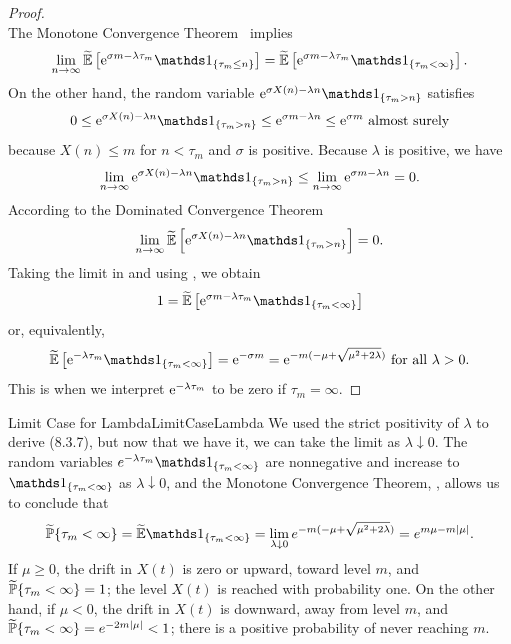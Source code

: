 \begin{proof}
\[	\]
	The Monotone Convergence Theorem~ implies
	\begin{equation} \label{eq:MonotoneConvergenceLimit}
		\lim_{n \to \infty} \widetilde{\E}\left[\e^{\sigma m - \lambda \tau_m}\I_{\{\tau_m \le n\}}\right] = \widetilde{\E}\left[\e^{\sigma m - \lambda \tau_m}\I_{\{\tau_m < \infty\}}\right].
	\end{equation}
	On the other hand, the random variable \(\e^{\sigma X(n) - \lambda n}\I_{\{\tau_m > n\}}\) satisfies
	\[
		0 \le \e^{\sigma X(n) - \lambda n}\I_{\{\tau_m > n\}} \le \e^{\sigma m - \lambda n} \le \e^{\sigma m} \text{ almost surely}
	\]
	because \(X(n) \le m\) for \(n < \tau_m\) and \(\sigma\) is positive. Because \(\lambda\) is positive, we have
	\[
		\lim_{n \to \infty} \e^{\sigma X(n) - \lambda n}\I_{\{\tau_m > n\}} \le \lim_{n \to \infty} \e^{\sigma m - \lambda n} = 0.
	\]
	According to the Dominated Convergence Theorem~
	\begin{equation} \label{eq:DominatedConvergenceLimit}
		\lim_{n \to \infty} \widetilde{\E}\left[\e^{\sigma X(n) - \lambda n}\I_{\{\tau_m > n\}}\right] = 0.
	\end{equation}
	Taking the limit in  and using , we obtain
	\[
		1 = \widetilde{\E}\left[\e^{\sigma m - \lambda \tau_m}\I_{\{\tau_m < \infty\}}\right]
	\]
	or, equivalently,
	\begin{equation} \label{eq:FinalLaplaceResult}
		\widetilde{\E}\left[\e^{-\lambda \tau_m}\I_{\{\tau_m < \infty\}}\right] = \e^{-\sigma m} = \e^{-m(-\mu + \sqrt{\mu^2 + 2\lambda})} \text{ for all } \lambda > 0.
	\end{equation}
	This is  when we interpret \(\mathrm{e}^{-\lambda \tau_m}\) to be zero if \(\tau_m = \infty\).
\end{proof}

\begin{xtip}{Limit Case for Lambda}{LimitCaseLambda}
	We used the strict positivity of \(\lambda\) to derive (8.3.7), but now that we have it, we can take the limit as \(\lambda \downarrow 0\). The random variables \(e^{-\lambda \tau_m} \I_{\set{\tau_m < \infty}}\) are nonnegative and increase to \(\I_{\set{\tau_m < \infty}}\) as \(\lambda \downarrow 0\), and the Monotone Convergence Theorem, , allows us to conclude that
	\begin{equation*}
		\widetilde{\Prob}\set{\tau_m < \infty} = \widetilde{\E}\I_{\set{\tau_m < \infty}} = \lim_{\lambda \downarrow 0} e^{-m(-\mu + \sqrt{\mu^2 + 2\lambda})} = e^{m\mu - m\abs{\mu}}.
	\end{equation*}
	If \(\mu \ge 0\), the drift in \(X(t)\) is zero or upward, toward level \(m\), and \(\widetilde{\mathbb{P}}\{\tau_m < \infty\} = 1\); the level \(X(t)\) is reached with probability one. On the other hand, if \(\mu < 0\), the drift in \(X(t)\) is downward, away from level \(m\), and \(\widetilde{\mathbb{P}}\{\tau_m < \infty\} = e^{-2m\lvert\mu\rvert} < 1\); there is a positive probability of never reaching \(m\).
\end{xtip}

